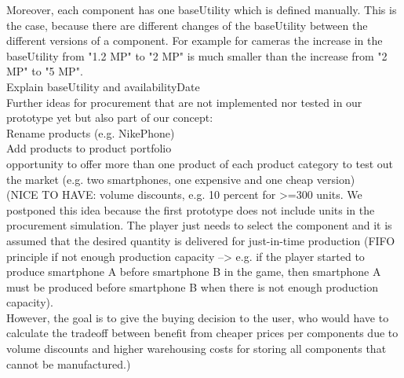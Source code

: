 \documentclass[11pt,titlepage,oneside,openany]{book}
\begin{document}
Moreover, each component has one baseUtility which is defined manually. This is the case, because there are different changes of the baseUtility between the different versions of a component. For example for cameras the increase in the baseUtility from "1.2 MP" to "2 MP" is much smaller than the increase from "2 MP" to "5 MP". \\

Explain baseUtility and availabilityDate\\

Further ideas for procurement that are not implemented nor tested in our prototype yet but also part of our concept: \\
Rename products (e.g. NikePhone) \\
Add products to product portfolio \\
opportunity to offer more than one product of each product category to test out the market (e.g. two smartphones, one expensive and one cheap version)\\
(NICE TO HAVE: volume discounts, e.g. 10 percent for >=300 units. We postponed this idea because the first prototype does not include units in the procurement simulation. The player just needs to select the component and it is assumed that the desired quantity is delivered for just-in-time production (FIFO principle if not enough production capacity --> e.g. if the player started to produce smartphone A before smartphone B in the game, then smartphone A must be produced before smartphone B when there is not enough production capacity). \\
However, the goal is to give the buying decision to the user, who would have to calculate the tradeoff between benefit from cheaper prices per components due to volume discounts and higher warehousing costs for storing all components that cannot be manufactured.)
\end{document}
